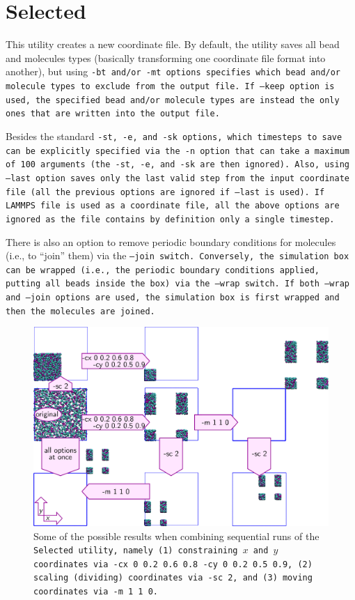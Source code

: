 \section{Selected} \label{sec:Selected}

This utility creates a new coordinate file. By default, the utility saves all
bead and molecules types (basically transforming one coordinate file format into
another), but using \tt{-bt} and/or \tt{-mt} options specifies which bead and/or
molecule types to exclude from the output file. If \tt{--keep} option is used,
the specified bead and/or molecule types are instead the only ones that are
written into the output file.

Besides the standard \tt{-st}, \tt{-e}, and \tt{-sk} options, which timesteps to
save can be explicitly specified via the \tt{-n} option that can take a maximum
of 100 arguments (the \tt{-st}, \tt{-e}, and \tt{-sk} are then ignored). Also,
using \tt{--last} option saves only the last valid step from the input
coordinate file (all the previous options are ignored if \tt{--last} is used).
If LAMMPS \data file is used as a coordinate file, all the above options are
ignored as the \data file contains by definition only a single timestep.

There is also an option to remove periodic boundary conditions for molecules
(i.e., to \enquote{join} them) via the \tt{--join} switch. Conversely, the
simulation box can be wrapped (i.e., the periodic boundary conditions applied,
putting all beads inside the box) via the \tt{--wrap} switch. If both
\tt{--wrap} and \tt{--join} options are used, the simulation box is first
wrapped and then the molecules are joined.

\begin{figure}[b]
  \centering
  \includegraphics{Selected.png}
  \caption{
    Some of the possible results when combining sequential runs of the
    \tt{Selected} utility, namely (1) constraining $x$ and $y$ coordinates via
    \tt{-cx 0 0.2 0.6 0.8 -cy 0 0.2 0.5 0.9}, (2) scaling (dividing) coordinates
    via \tt{-sc 2}, and (3) moving coordinates via \tt{-m 1 1 0}.
  }
  \label{fig:Selected}
\end{figure}

